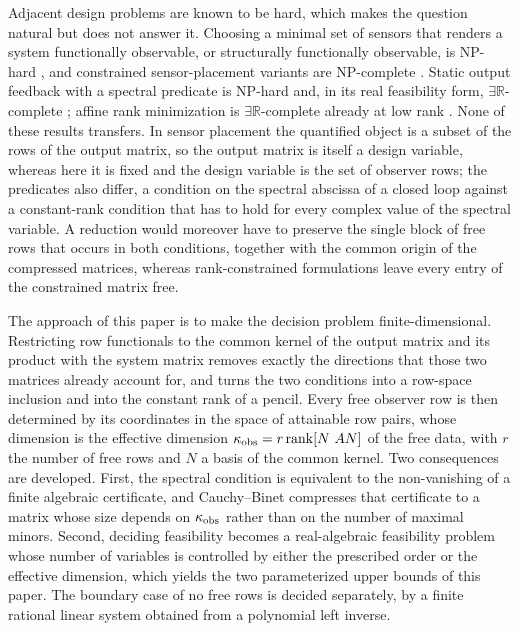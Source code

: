 Adjacent design problems are known to be hard, which makes the question natural but does
not answer it. Choosing a minimal set of sensors that renders a system functionally
observable, or structurally functionally observable, is NP-hard \cite{zha25}, and
constrained sensor-placement variants are NP-complete \cite{dey21}. Static output feedback
with a spectral predicate is NP-hard \cite{lof26,bar26} and, in its real feasibility form,
$\exists\mathbb R$-complete \cite{liu26}; affine rank minimization is
$\exists\mathbb R$-complete already at low rank \cite{maj26}. None of these results
transfers. In sensor placement the quantified object is a subset of the rows of the output
matrix, so the output matrix is itself a design variable, whereas here it is fixed and the
design variable is the set of observer rows; the predicates also differ, a condition on the
spectral abscissa of a closed loop against a constant-rank condition that has to hold for
every complex value of the spectral variable. A reduction would moreover have to preserve
the single block of free rows that occurs in both conditions, together with the common
origin of the compressed matrices, whereas rank-constrained formulations leave every entry
of the constrained matrix free.

The approach of this paper is to make the decision problem finite-dimensional. Restricting
row functionals to the common kernel of the output matrix and its product with the system
matrix removes exactly the directions that those two matrices already account for, and
turns the two conditions into a row-space inclusion and into the constant rank of a
pencil. Every free observer row is then determined by its coordinates in the space of
attainable row pairs, whose dimension is the effective dimension
$\kappa_{\rm obs}=r\operatorname{rank}[N\ AN]$ of the free data, with $r$ the number of
free rows and $N$ a basis of the common kernel. Two consequences are developed. First, the
spectral condition is equivalent to the non-vanishing of a finite algebraic certificate,
and Cauchy--Binet compresses that certificate to a matrix whose size depends on
$\kappa_{\rm obs}$ rather than on the number of maximal minors. Second, deciding
feasibility becomes a real-algebraic feasibility problem whose number of variables is
controlled by either the prescribed order or the effective dimension, which yields the two
parameterized upper bounds of this paper. The boundary case of no free rows is decided
separately, by a finite rational linear system obtained from a polynomial left inverse.

